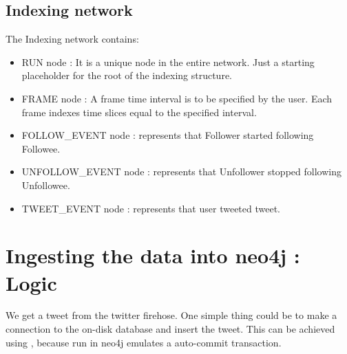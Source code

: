 \documentclass[letterpaper,10pt,english]{sphinxmanual}
\begin{document}
\noindent{}


\subsection{Indexing network}
\label{\detokenize{neo4j_data_ingestion:indexing-network}}
The Indexing network contains:
\begin{itemize}
\item {} 
RUN node : It is a unique node in the entire network. Just a starting placeholder for the root of the indexing structure.

\item {} 
FRAME node : A frame time interval is to be specified by the user. Each frame indexes time slices equal to the specified interval.

\item {} 
FOLLOW\_EVENT node : represents that Follower started following Followee.

\item {} 
UNFOLLOW\_EVENT node : represents that Unfollower stopped following Unfollowee.

\item {} 
TWEET\_EVENT node : represents that user tweeted tweet.

\end{itemize}

\noindent{}


\section{Ingesting the data into neo4j : Logic}
\label{\detokenize{neo4j_data_ingestion:ingesting-the-data-into-neo4j-logic}}
We get a tweet from the twitter firehose. One simple thing could be to make a connection to the on-disk database and insert the tweet. This can be achieved using , because run in neo4j emulates a auto-commit transaction.
\end{document}
